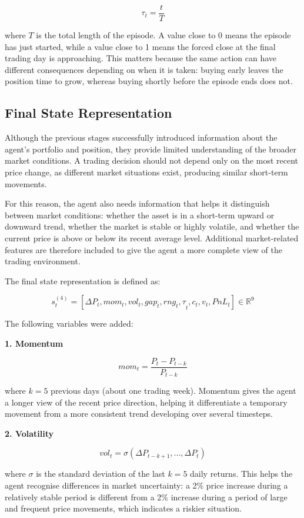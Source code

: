 \[\tau_{t} = \frac{t}{T}\]

where \(T\) is the total length of the
episode. A value close to 0 means the episode has just started, while a
value close to 1 means the forced close at the final trading day is
approaching. This matters because the same action can have different
consequences depending on when it is taken: buying early leaves the
position time to grow, whereas buying shortly before the episode ends
does not.

\subsection{Final State Representation}

Although the previous stages successfully introduced information about
the agent's portfolio and position, they provide limited understanding
of the broader market conditions. A trading decision should not depend
only on the most recent price change, as different market situations
exist, producing similar short-term movements.

For this reason, the agent also needs information that helps it
distinguish between market conditions: whether the asset is in a
short-term upward or downward trend, whether the market is stable or
highly volatile, and whether the current price is above or below its
recent average level. Additional market-related features are therefore
included to give the agent a more complete view of the trading
environment.

The final state representation is defined as:

\[\boxed{s_{t}^{(4)} = \left\lbrack \Delta P_{t},mom_{t},vol_{t},gap_{t},{rng_{t},\tau}_{t},c_{t},v_{t},PnL_{t} \right\rbrack \in \mathbb{R}^{9}}\]

The following variables were added:

\textbf{1. Momentum}

\[mom_{t} = \frac{P_{t} - P_{t - k}}{P_{t - k}}\]

where \(k = 5\) previous days (about one trading week). Momentum gives
the agent a longer view of the recent price direction, helping it
differentiate a temporary movement from a more consistent trend
developing over several timesteps.

\textbf{2. Volatility}

\[vol_{t} = \sigma\left( \Delta P_{t - k + 1},...,\Delta P_{t} \right)\]

where \(\sigma\) is the standard deviation of the last \(k = 5\) daily
returns. This helps the agent recognise differences in market
uncertainty: a 2\% price increase during a relatively stable period is
different from a 2\% increase during a period of large and frequent
price movements, which indicates a riskier situation.

